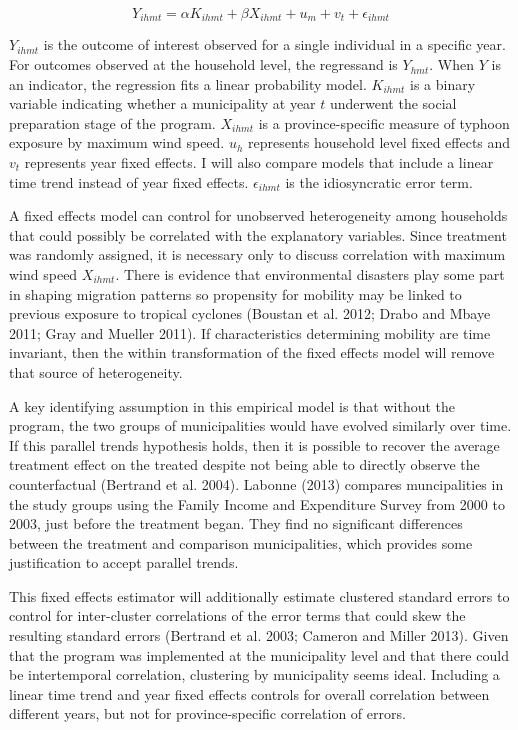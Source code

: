 \documentclass[12pt]{article}
\begin{document}
	\[Y_{ihmt} = \alpha K_{ihmt} + \beta X_{ihmt} + u_{m} + v_{t} + \epsilon_{ihmt}\]

	$Y_{ihmt}$ is the outcome of interest observed for a single individual in a specific year. For outcomes observed at the household level, the regressand is $Y_{hmt}$. When $Y$ is an indicator, the regression fits a linear probability model. $K_{ihmt}$ is a binary variable indicating whether a municipality at year $t$ underwent the social preparation stage of the program. $X_{ihmt}$ is a province-specific measure of typhoon exposure by maximum wind speed. $u_{h}$ represents household level fixed effects and $v_{t}$ represents year fixed effects. I will also compare models that include a linear time trend instead of year fixed effects. $\epsilon_{ihmt}$ is the idiosyncratic error term.

	A fixed effects model can control for unobserved heterogeneity among households that could possibly be correlated with the explanatory variables. Since treatment was randomly assigned, it is necessary only to discuss correlation with maximum wind speed $X_{ihmt}$. There is evidence that environmental disasters play some part in shaping migration patterns so propensity for mobility may be linked to previous exposure to tropical cyclones (Boustan et al. 2012; Drabo and Mbaye 2011; Gray and Mueller 2011). If characteristics determining mobility are time invariant, then the within transformation of the fixed effects model will remove that source of heterogeneity. 

	A key identifying assumption in this empirical model is that without the program, the two groups of municipalities would have evolved similarly over time. If this parallel trends hypothesis holds, then it is possible to recover the average treatment effect on the treated despite not being able to directly observe the counterfactual (Bertrand et al. 2004). Labonne (2013) compares muncipalities in the study groups using the Family Income and Expenditure Survey from 2000 to 2003, just before the treatment began. They find no significant differences between the treatment and comparison municipalities, which provides some justification to accept parallel trends.

	This fixed effects estimator will additionally estimate clustered standard errors to control for inter-cluster correlations of the error terms that could skew the resulting standard errors (Bertrand et al. 2003; Cameron and Miller 2013). Given that the program was implemented at the municipality level and that there could be intertemporal correlation, clustering by municipality seems ideal. Including a linear time trend and year fixed effects controls for overall correlation between different years, but not for province-specific correlation of errors.
\end{document}
